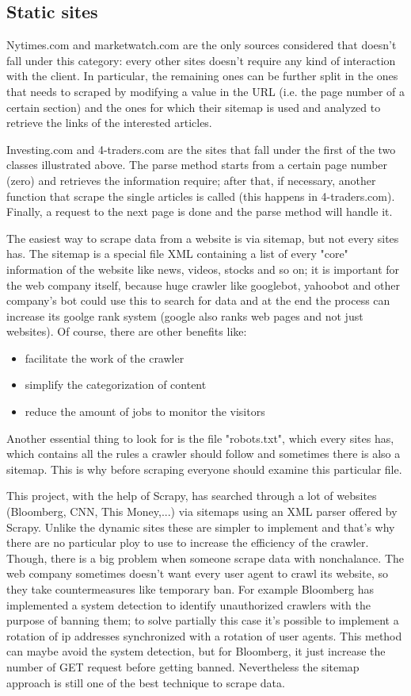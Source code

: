 \subsection{Static sites}
Nytimes.com and marketwatch.com are the only sources considered that doesn't fall under this category: every other sites doesn't require any kind of interaction with the client. In particular, the remaining ones can be further split in the ones that needs to scraped by modifying a value in the URL (i.e. the page number of a certain section) and the ones for which their sitemap is used and analyzed to retrieve the links of the interested articles. 
\par
Investing.com and 4-traders.com are the sites that fall under the first of the two classes illustrated above. The parse method starts from a certain page number (zero) and retrieves the information require; after that, if necessary, another function that scrape the single articles is called (this happens in 4-traders.com). Finally, a request to the next page is done and the parse method will handle it.
\par 
The easiest way to scrape data from a website is via sitemap, but not every sites has. The sitemap is a special file XML containing a list of every "core" information of the website like news, videos, stocks and so on; it is important for the web company itself, because huge crawler like googlebot, yahoobot and other company's bot could use this to search for data and at the end the process can increase its goolge rank system (google also ranks web pages and not just websites). Of course, there are other benefits like:
\begin{itemize}
	\item facilitate the work of the crawler
	\item simplify the categorization of content
	\item reduce the amount of jobs to monitor the visitors
\end{itemize}
Another essential thing to look for is the file "robots.txt", which every sites has, which contains all the rules a crawler should follow and sometimes there is also a sitemap. This is why before scraping everyone should examine this particular file. 
\par 
This project, with the help of Scrapy, has searched through a lot of websites (Bloomberg, CNN, This Money,...) via sitemaps using an XML parser offered by Scrapy. Unlike the dynamic sites these are simpler to implement and that's why there are no particular ploy to use to increase the efficiency of the crawler. Though, there is a big problem when someone scrape data with nonchalance. The web company sometimes doesn't want every user agent to crawl its website, so they take countermeasures like temporary ban. For example Bloomberg has implemented a system detection to identify unauthorized crawlers with the purpose of banning them; to solve partially this case it's possible to implement a rotation of ip addresses synchronized with a rotation of user agents. This method can maybe avoid the system detection, but for Bloomberg, it just increase the number of GET request before getting banned. Nevertheless the sitemap approach is still one of the best technique to scrape data.
